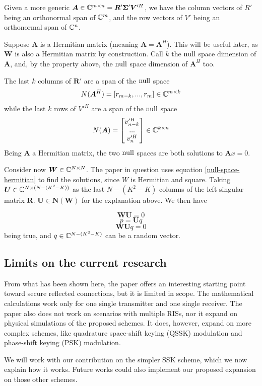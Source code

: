 Given a more generic $\bm{A} \in \mathbb{C}^{m \times n} = \bm{R}'\bm{ \Sigma}' \bm{V}'^H$, we have the column vectors of $R'$ being an orthonormal span of $\mathbb{C}^m$, and the row vectors of $V'$ being an orthonormal span of $\mathbb{C}^n$.

Suppose $\bm{A}$ is a Hermitian matrix (meaning $\bm{A} = \bm{A}^H$). This will be useful later, as $\bm{W}$ is also a Hermitian matrix by construction. Call $k$ the $\operatorname{null}$ space dimension of $\bm{A}$, and, by the property above, the $\operatorname{null}$ space dimension of $\bm{A}^H$ too.

The last $k$ columns of $\bm{R}'$ are a span of the $\operatorname{null}$ space
\begin{equation}
  N(\bm{A}^H) = [r_{m-k}, ..., r_m ] \in \mathbb{C}^{m \times k}
  \label{null-space-hermitian}
\end{equation}
while the last $k$ rows of $V'^H$ are a span of the $\operatorname{null}$ space
\begin{equation}
  N(\bm{A}) = \begin{bmatrix} v'^H_{n-k} \\ ... \\ v'^H_n \end{bmatrix} \in \mathbb{C}^{k \times n}
  \label{null-space-normal}
\end{equation}
Being $\bm{A}$ a Hermitian matrix, the two $\operatorname{null}$ spaces are both solutions to $\bm{A}x = 0$.

Consider now $\bm{W} \in \mathbb{C}^{N \times N}$. The paper in question uses equation \eqref{null-space-hermitian} to find the solutions, since $W$ is Hermitian and square. Taking $\bm{U} \in \mathbb{C} ^ {N \times (N-(K^2 - K))}$ as the last $N-(K^2 - K)$ columns of the left singular matrix $\bm{R}$. $\bm{U} \in \bm{N}(\bm{W})$ for the explanation above. We then have

\begin{equation}\bm{WU} = 0\end{equation}
\begin{equation}p = \bm{U}q\end{equation}
\begin{equation}
  \bm{WU}q = 0
  \label{q_random_vector}
\end{equation}
being true, and $q \in \mathbb{C}^{N-(K^2 - K)}$ can be a random vector.

\newpage
\subsection{Limits on the current research}

From what has been shown here, the paper \cite{9328149} offers an interesting starting point toward secure reflected connections, but it is limited in scope. The mathematical calculations work only for one single transmitter and one single receiver. The paper also does not work on scenarios with multiple RISs, nor it expand on physical simulations of the proposed schemes. It does, however, expand on more complex schemes, like quadrature space-shift keying (QSSK) modulation and phase-shift keying (PSK) modulation.

We will work with our contribution on the simpler SSK scheme, which we now explain how it works. Future works could also implement our proposed expansion on those other schemes.
